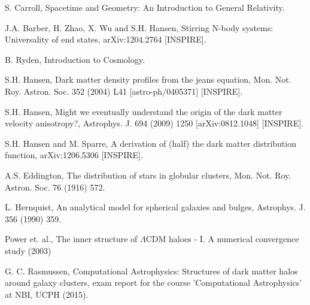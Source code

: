 \begin{thebibliography}{99}
\bibitem{} S. Carroll, Spacetime and Geometry: An Introduction to General Relativity.

\bibitem{} J.A. Barber, H. Zhao, X. Wu and S.H. Hansen, Stirring N-body systems: Universality of end states, arXiv:1204.2764 [INSPIRE].

\bibitem{} B. Ryden, Introduction to Cosmology.

\bibitem{} S.H. Hansen, Dark matter density profiles from the jeans equation, Mon. Not. Roy. Astron. Soc. 352 (2004) L41 [astro-ph/0405371] [INSPIRE].

\bibitem{} S.H. Hansen, Might we eventually understand the origin of the dark matter velocity anisotropy?, Astrophys. J. 694 (2009) 1250 [arXiv:0812.1048] [INSPIRE].

\bibitem{} S.H. Hansen and M. Sparre, A derivation of (half) the dark matter distribution function, arXiv:1206.5306 [INSPIRE].

\bibitem{} A.S. Eddington, The distribution of stars in globular clusters, Mon. Not. Roy. Astron. Soc. 76 (1916) 572.

\bibitem{} L. Hernquist, An analytical model for spherical galaxies and bulges, Astrophys. J. 356 (1990) 359.

\bibitem{} Power et. al., The inner structure of $\Lambda$CDM haloes - I. A numerical convergence study (2003)

\bibitem{} G. C. Rasmussen, Computational Astrophysics: Structures of dark matter halos around galaxy clusters, exam report for the course 'Computational Astrophysics' at NBI, UCPH (2015).

\end{thebibliography}